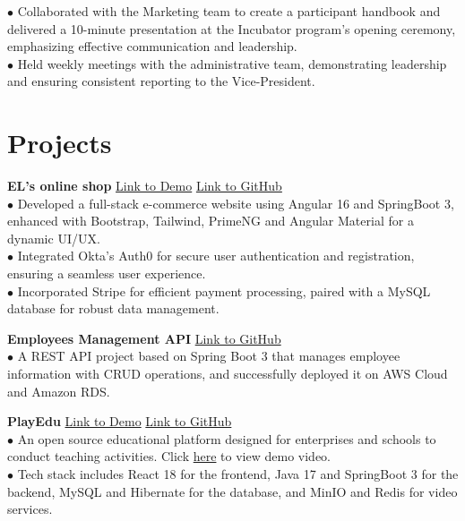 \documentclass[letterpaper,12pt]{article}
\begin{document}
\hspace{0.1cm} $\bullet$ \hspace{0.3cm}Collaborated with the Marketing team to create a participant handbook and delivered a 10-minute presentation at the Incubator program's opening ceremony, emphasizing effective communication and leadership.\\
\hspace{0.1cm} $\bullet$ \hspace{1em}Held weekly meetings with the administrative team, demonstrating leadership and ensuring consistent reporting to the Vice-President.


\section{Projects}

\textbf{EL's online shop} \hfill \href{https://youtu.be/q0_N9ydf67c}{Link to Demo} \hspace{0.2cm} \href{https://github.com/Zicheng-Li/Angular-ecommerce-frontend}{Link to GitHub}\\
\hspace{0.1cm} $\bullet$ \hspace{0.4332cm}Developed a full-stack e-commerce website using Angular 16 and SpringBoot 3, enhanced with Bootstrap, Tailwind, PrimeNG and Angular Material for a dynamic UI/UX. \\
\hspace{0.1cm} $\bullet$ \hspace{1em}Integrated Okta's Auth0 for secure user authentication and registration, ensuring a seamless user experience. \\ 
\hspace{0.1cm} $\bullet$ \hspace{1em}Incorporated Stripe for efficient payment processing, paired with a MySQL database for robust data management.

\textbf{Employees Management API} \hfill \href{https://github.com/Zicheng-Li/employees-management-project}{Link to GitHub} \\
\hspace{0.1cm} $\bullet$ \hspace{1em}A REST API project based on Spring Boot 3 that manages employee information with CRUD operations, and successfully deployed it on AWS Cloud and Amazon RDS.

\textbf{PlayEdu} \hfill \href{https://youtu.be/8IWqM2eHLhc}{Link to Demo} \hspace{0.2cm} \href{https://github.com/Zicheng-Li/React-Spring_Boot-PlayEdu}{Link to GitHub} \\
\hspace{0.1cm} $\bullet$ \hspace{1em}An open source educational platform designed for enterprises and schools to conduct teaching activities. Click \href{https://youtu.be/8IWqM2eHLhc}{here} to view demo video.\\
\hspace{0.1cm} $\bullet$ \hspace{0.41cm}Tech stack includes React 18 for the frontend, Java 17 and SpringBoot 3 for the backend, MySQL and Hibernate for the database, and MinIO and Redis for video services.
\end{document}
